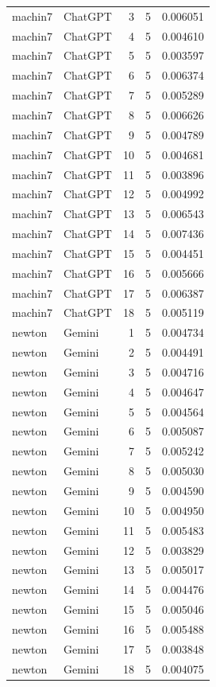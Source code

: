 \begin{longtable}{llrrr}
machin7 & ChatGPT & 3 & 5 & 0.006051\\
machin7 & ChatGPT & 4 & 5 & 0.004610\\
machin7 & ChatGPT & 5 & 5 & 0.003597\\
machin7 & ChatGPT & 6 & 5 & 0.006374\\
machin7 & ChatGPT & 7 & 5 & 0.005289\\
machin7 & ChatGPT & 8 & 5 & 0.006626\\
machin7 & ChatGPT & 9 & 5 & 0.004789\\
machin7 & ChatGPT & 10 & 5 & 0.004681\\
machin7 & ChatGPT & 11 & 5 & 0.003896\\
machin7 & ChatGPT & 12 & 5 & 0.004992\\
machin7 & ChatGPT & 13 & 5 & 0.006543\\
machin7 & ChatGPT & 14 & 5 & 0.007436\\
machin7 & ChatGPT & 15 & 5 & 0.004451\\
machin7 & ChatGPT & 16 & 5 & 0.005666\\
machin7 & ChatGPT & 17 & 5 & 0.006387\\
machin7 & ChatGPT & 18 & 5 & 0.005119\\
newton & Gemini & 1 & 5 & 0.004734\\
newton & Gemini & 2 & 5 & 0.004491\\
newton & Gemini & 3 & 5 & 0.004716\\
newton & Gemini & 4 & 5 & 0.004647\\
newton & Gemini & 5 & 5 & 0.004564\\
newton & Gemini & 6 & 5 & 0.005087\\
newton & Gemini & 7 & 5 & 0.005242\\
newton & Gemini & 8 & 5 & 0.005030\\
newton & Gemini & 9 & 5 & 0.004590\\
newton & Gemini & 10 & 5 & 0.004950\\
newton & Gemini & 11 & 5 & 0.005483\\
newton & Gemini & 12 & 5 & 0.003829\\
newton & Gemini & 13 & 5 & 0.005017\\
newton & Gemini & 14 & 5 & 0.004476\\
newton & Gemini & 15 & 5 & 0.005046\\
newton & Gemini & 16 & 5 & 0.005488\\
newton & Gemini & 17 & 5 & 0.003848\\
newton & Gemini & 18 & 5 & 0.004075\\

\end{longtable}
